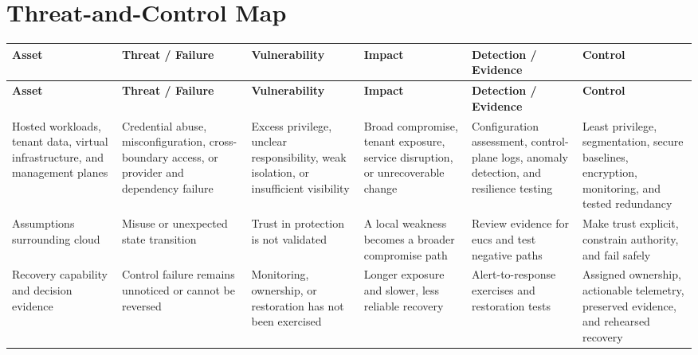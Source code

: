 \documentclass[11pt,letterpaper]{article}
\begin{document}
\section*{Threat-and-Control Map}
\begingroup\scriptsize\setlength{\tabcolsep}{2pt}
\begin{longtable}{>{\raggedright\arraybackslash}p{}>{\raggedright\arraybackslash}p{}>{\raggedright\arraybackslash}p{}>{\raggedright\arraybackslash}p{}>{\raggedright\arraybackslash}p{}>{\raggedright\arraybackslash}p{}}
\toprule\rowcolor{Navy}\color{white}\textbf{Asset} & \color{white}\textbf{Threat / Failure} & \color{white}\textbf{Vulnerability} & \color{white}\textbf{Impact} & \color{white}\textbf{Detection / Evidence} & \color{white}\textbf{Control}\\\midrule
\endfirsthead
\toprule\rowcolor{Navy}\color{white}\textbf{Asset} & \color{white}\textbf{Threat / Failure} & \color{white}\textbf{Vulnerability} & \color{white}\textbf{Impact} & \color{white}\textbf{Detection / Evidence} & \color{white}\textbf{Control}\\\midrule
\endhead
Hosted workloads, tenant data, virtual infrastructure, and management planes & Credential abuse, misconfiguration, cross-boundary access, or provider and dependency failure & Excess privilege, unclear responsibility, weak isolation, or insufficient visibility & Broad compromise, tenant exposure, service disruption, or unrecoverable change & Configuration assessment, control-plane logs, anomaly detection, and resilience testing & Least privilege, segmentation, secure baselines, encryption, monitoring, and tested redundancy\\\midrule
Assumptions surrounding cloud & Misuse or unexpected state transition & Trust in protection is not validated & A local weakness becomes a broader compromise path & Review evidence for eucs and test negative paths & Make trust explicit, constrain authority, and fail safely\\\midrule
Recovery capability and decision evidence & Control failure remains unnoticed or cannot be reversed & Monitoring, ownership, or restoration has not been exercised & Longer exposure and slower, less reliable recovery & Alert-to-response exercises and restoration tests & Assigned ownership, actionable telemetry, preserved evidence, and rehearsed recovery\\\midrule
\bottomrule
\end{longtable}
\endgroup
\end{document}

